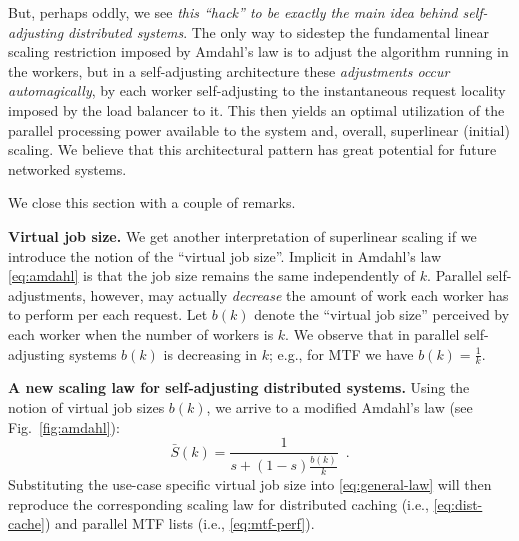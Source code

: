 \documentclass[letterpaper,twocolumn,10pt]{article}
\begin{document}
But, perhaps oddly, we see \emph{this ``hack'' to be exactly the main idea behind self-adjusting distributed systems}. The only way to sidestep the fundamental linear scaling restriction imposed by Amdahl's law is to adjust the algorithm running in the workers, but in a self-adjusting architecture these \emph{adjustments occur automagically}, by each worker self-adjusting to the instantaneous request locality imposed by the load balancer to it. This then yields an optimal utilization of the parallel processing power available to the system and, overall, superlinear (initial) scaling.  We believe that this architectural pattern has great potential for future networked systems.

We close this section with a couple of remarks.

\noindent
\textbf{Virtual job size.} %
We get another interpretation of superlinear scaling if we introduce the notion of the ``virtual job size''. Implicit in Amdahl's law \eqref{eq:amdahl} is that the job size remains the same independently of $k$. Parallel self-adjustments, however, may actually \emph{decrease} the amount of work each worker has to perform per each request. Let $b(k)$ denote the ``virtual job size'' perceived by each worker when the number of  workers is $k$. We observe that in parallel self-adjusting systems $b(k)$ is decreasing in $k$; e.g., for MTF we have $b(k) = \frac1{k}$.


\noindent
\textbf{A new scaling law for self-adjusting distributed systems.} %
Using the notion of virtual job sizes $b(k)$, we arrive to a modified Amdahl's law (see Fig.~\ref{fig:amdahl}):
\begin{equation}\label{eq:general-law}
\bar{S}(k) = \frac{1}{s + (1-s)\frac{b(k)}{k}} \enspace .
\end{equation}
Substituting the use-case specific virtual job size into \eqref{eq:general-law} will then reproduce the corresponding scaling law for  distributed caching (i.e., \eqref{eq:dist-cache}) and parallel MTF lists (i.e., \eqref{eq:mtf-perf}).
\end{document}

